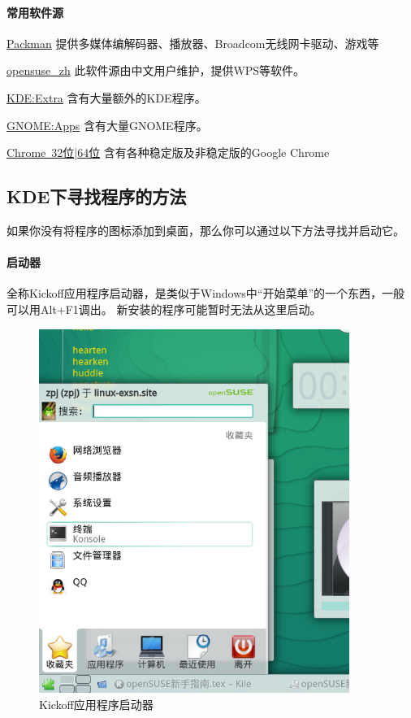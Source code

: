 \paragraph{常用软件源}\label{repo}

\begin{compactdesc}
 \item[\href{http://mirrors.hust.edu.cn/packman/suse/openSUSE_13.2/}{Packman}]
 提供多媒体编解码器、播放器、Broadcom无线网卡驱动、游戏等
 \item[\href{http://download.opensuse.org/repositories/home:/opensuse_zh/openSUSE_13.2/}{opensuse\_zh}]
 此软件源由中文用户维护，提供WPS等软件。
 \item[\href{http://download.opensuse.org/repositories/KDE:/Extra/openSUSE_13.2/}{KDE:Extra}]
 含有大量额外的KDE程序。
 \item[\href{http://download.opensuse.org/repositories/GNOME:/Apps/openSUSE_13.2/}{GNOME:Apps}]
 含有大量GNOME程序。
 \item[\href{http://dl.google.com/linux/chrome/rpm/stable/i386}{Chrome~32位}|\href{http://dl.google.com/linux/chrome/rpm/stable/x86_64}{64位}] 含有各种稳定版及非稳定版的Google Chrome
\end{compactdesc}
\subsection{KDE下寻找程序的方法}
如果你没有将程序的图标添加到桌面，那么你可以通过以下方法寻找并启动它。
\paragraph{启动器} 全称Kickoff应用程序启动器，是类似于Windows中“开始菜单”的一个东西，一般可以用Alt+F1调出。
新安装的程序可能暂时无法从这里启动。
\begin{figure}[htbp!]
\centering
\includegraphics[width=0.9\textwidth]{./pic/kickoff.png} 
\caption{Kickoff应用程序启动器}
\end{figure}

